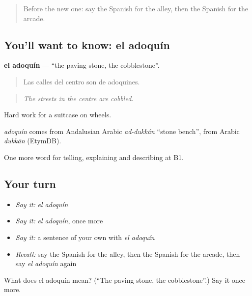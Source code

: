 \label{lesson:ES-C675-adoquin}



\begin{quote}
Before the new one: say the Spanish for the alley, then the Spanish for the arcade.
\end{quote}

\subsection*{You'll want to know: el adoquín}
\textbf{el adoquín} — \textquotedblleft{}the paving stone, the cobblestone\textquotedblright{}.

\begin{quote}
Las calles del centro son de adoquines.
\end{quote}

\begin{quote}
\emph{The streets in the centre are cobbled.}
\end{quote}

Hard work for a suitcase on wheels.

\begin{cousinweb}
\emph{adoquín} comes from Andalusian Arabic \emph{ad-dukkán} \textquotedblleft{}stone bench\textquotedblright{}, from Arabic \emph{dukkān} (EtymDB).
\end{cousinweb}

\begin{grammarlens}[title={What you've built}]
One more word for telling, explaining and describing at B1.
\end{grammarlens}

\subsection*{Your turn}
\begin{itemize}
\raggedright
  \item \emph{Say it:} \emph{el adoquín}
  \item \emph{Say it:} \emph{el adoquín}, once more
  \item \emph{Say it:} a sentence of your own with \emph{el adoquín}
  \item \emph{Recall:} say the Spanish for the alley, then the Spanish for the arcade, then say \emph{el adoquín} again
\end{itemize}

\begin{tcolorbox}[breakable,colback=teal!4,colframe=teal!35!black,title={Before you move on}]
What does el adoquín mean? (\textquotedblleft{}The paving stone, the cobblestone\textquotedblright{}.) Say it once more.
\end{tcolorbox}
